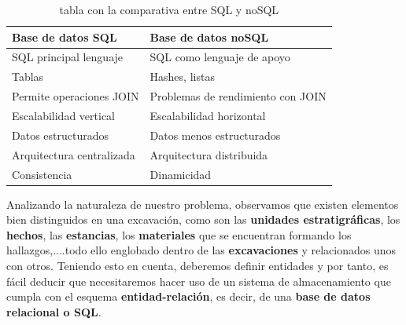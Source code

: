     \begin{table}[H]
        \begin{center}
            \begin{tabular}{ |l|l| } \hline
                \textbf{Base de datos SQL} & \textbf{Base de datos noSQL} \\ \hline
                SQL principal lenguaje & SQL como lenguaje de apoyo \\
                Tablas & Hashes, listas \\
                Permite operaciones JOIN & Problemas de rendimiento con JOIN \\
                Escalabilidad vertical & Escalabilidad horizontal \\
                Datos estructurados & Datos menos estructurados \\ 
                Arquitectura centralizada & Arquitectura distribuida \\
                Consistencia & Dinamicidad \\ \hline
            \end{tabular}
            \caption{tabla con la comparativa entre SQL y noSQL}
            \label{tab:databases}
        \end{center}
    \end{table}

Analizando la naturaleza de nuestro problema, observamos que existen elementos bien
distinguidos en una excavación, como son las \textbf{unidades estratigráficas}, los 
\textbf{hechos}, las \textbf{estancias}, los \textbf{materiales} que se encuentran formando
los hallazgos,....todo ello englobado dentro de las \textbf{excavaciones} y relacionados
unos con otros. Teniendo esto en cuenta, deberemos definir entidades y por tanto, es fácil
deducir que necesitaremos hacer uso de un sistema de almacenamiento que cumpla con el esquema
\textbf{entidad-relación}, es decir, de una \textbf{base de datos relacional o SQL}.
